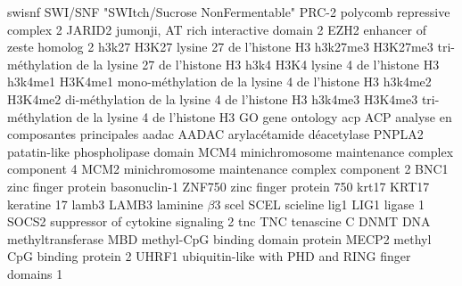 %
\newacronym
	{swisnf}
	{SWI/SNF}
	{"SWItch/Sucrose NonFermentable"}
	{PRC-2}
	{polycomb repressive complex 2}
	{JARID2}
	{jumonji, AT rich interactive domain 2}
	{EZH2}
	{enhancer of zeste homolog 2}
%
\newacronym
	{h3k27}
	{H3K27}
	{lysine 27 de l'histone H3}
\newacronym
	{h3k27me3}
	{H3K27me3}
	{tri-méthylation de la lysine 27 de l'histone H3}
\newacronym
	{h3k4}
	{H3K4}
	{lysine 4 de l'histone H3}
\newacronym
	{h3k4me1}
	{H3K4me1}
	{mono-méthylation de la lysine 4 de l'histone H3}
\newacronym
	{h3k4me2}
	{H3K4me2}
	{di-méthylation de la lysine 4 de l'histone H3}
\newacronym
	{h3k4me3}
	{H3K4me3}
	{tri-méthylation de la lysine 4 de l'histone H3}
%
	{GO}
	{gene ontology}
\newacronym
	{acp}
	{ACP}
	{analyse en composantes principales}
%
\newacronym
	{aadac}
	{AADAC}
	{arylacétamide déacetylase}
	{PNPLA2}
	{patatin-like phospholipase domain}
	{MCM4}
	{minichromosome maintenance complex component 4}
	{MCM2}
	{minichromosome maintenance complex component 2}
	{BNC1}
	{zinc finger protein basonuclin-1}
	{ZNF750}
	{zinc finger protein 750}
\newacronym
	{krt17}
	{KRT17}
	{keratine 17}
\newacronym
	{lamb3}
	{LAMB3}
	{laminine $\beta$3}
\newacronym
	{scel}
	{SCEL}
	{scieline}
\newacronym
	{lig1}
	{LIG1}
	{ligase 1}
	{SOCS2}
	{suppressor of cytokine signaling 2}
\newacronym
	{tnc}
	{TNC}
	{tenascine C}
	{DNMT}
	{DNA methyltransferase}
	{MBD}
	{methyl-CpG binding domain protein}
	{MECP2}
	{methyl CpG binding protein 2}
	{UHRF1}
	{ubiquitin-like with PHD and RING finger domains 1}